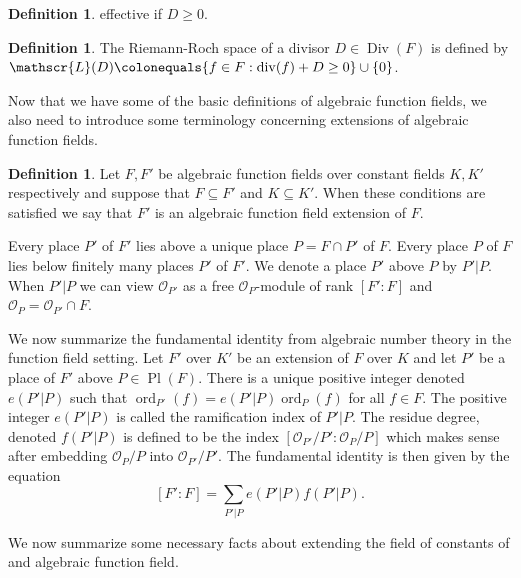\documentclass{dcthesis}
\newcommand{\OO}{\mathcal O}
\newcommand{\defi}[1]{\textsf{#1}}
\DeclareMathOperator{\Div}{Div}
\DeclareMathOperator{\ddiv}{div}
\DeclareMathOperator{\ord}{ord}
\DeclareMathOperator{\Pl}{Pl}
\numberwithin{equation}{section}
\theoremstyle{definition}
\newtheorem{definition}[equation]{Definition}
\theoremstyle{remark}
\begin{document}
{{{\begin{definition}
      \defi{effective}
      if $D\geq 0$.
    \end{definition}
    \begin{definition}
      \label{def:riemannroch}
      The \defi{Riemann-Roch space}
      of a divisor $D\in\Div(F)$ is defined by
      $\mathscr{L}(D)
      \colonequals
      \{
        f\in F : \ddiv(f)+D\geq 0
      \}
      \cup
      \{0\}
      $.
    \end{definition}
    Now that we have some of the basic definitions
    of algebraic function fields,
    we also need to 
    introduce some terminology
    concerning extensions of algebraic
    function fields.
    \begin{definition}
      \label{def:functionfieldextensions}
      Let $F,F'$ be algebraic function
      fields over constant fields $K,K'$
      respectively
      and suppose that
      $F\subseteq F'$ and $K\subseteq K'$.
      When these conditions are satisfied
      we say that
      $F'$ is an
      \defi{algebraic function field extension}
      of $F$.
    \end{definition}
    Every place $P'$ of $F'$ \defi{lies above}
    a unique place $P = F\cap P'$ of $F$.
    Every place $P$ of $F$ \defi{lies below}
    finitely many places $P'$ of $F'$.
    We denote a place $P'$ above $P$
    by $P'|P$.
    When $P'|P$ we can view $\OO_{P'}$
    as a free $\OO_P$-module
    of rank $[F':F]$
    and
    $\OO_P=\OO_{P'}\cap F$.
    \par
    We now summarize the
    fundamental identity
    from algebraic number theory
    in the function field setting.
    Let $F'$ over $K'$ be an extension
    of $F$ over $K$
    and let $P'$ be a place of $F'$ above
    $P\in\Pl(F)$.
    There is a unique positive integer
    denoted $e(P'|P)$
    such that
    $\ord_{P'}(f) = e(P'|P)\ord_P(f)$
    for all $f\in F$.
    The positive integer
    $e(P'|P)$ is called the
    \defi{ramification index of $P'|P$}.
    The \defi{residue degree},
    denoted $f(P'|P)$
    is defined to be the index
    $[\OO_{P'}/P':\OO_{P}/P]$
    which makes sense after embedding
    $\OO_P/P$ into $\OO_{P'}/P'$.
    The \defi{fundamental identity} is then
    given by the equation
    \begin{equation}
      \label{eqn:fundamentalidentity}
      [F':F]=
      \sum_{P'|P}e(P'|P)f(P'|P).
    \end{equation}
    \par
    We now summarize some necessary facts about
    extending the field of constants of
    and algebraic function field.
}}}
\end{document}
